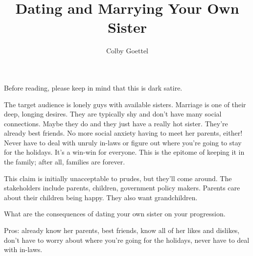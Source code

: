 \documentclass[12pt]{article}
\title{Dating and Marrying Your Own Sister}
\author{Colby Goettel}
\begin{document}
\maketitle




Before reading, please keep in mind that this is dark satire.

The target audience is lonely guys with available sisters. Marriage is one of their deep, longing desires. They are typically shy and don't have many social connections. Maybe they do and they just have a really hot sister. They're already best friends. No more social anxiety having to meet her parents, either! Never have to deal with unruly in-laws or figure out where you're going to stay for the holidays. It's a win-win for everyone. This is the epitome of keeping it in the family; after all, families are forever.

This claim is initially unacceptable to prudes, but they'll come around. The stakeholders include parents, children, government policy makers. Parents care about their children being happy. They also want grandchildren.

What are the consequences of dating your own sister on your progression.

Pros: already know her parents, best friends, know all of her likes and dislikes, don't have to worry about where you're going for the holidays, never have to deal with in-laws.
\end{document}
